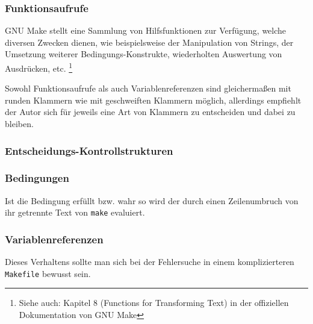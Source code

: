 	\subsubsection*{Funktionsaufrufe}  
		GNU Make stellt eine Sammlung von Hilfsfunktionen zur Verfügung, welche
		diversen Zwecken dienen, wie beispielsweise der Manipulation von
		Strings, der Umsetzung weiterer Bedingungs-Konstrukte, wiederholten
		Auswertung von Ausdrücken, etc.  \footnote{Siehe auch: Kapitel 8 (Functions
		for Transforming Text) in der offiziellen Dokumentation von GNU Make
		}

		Sowohl Funktionsaufrufe als auch Variablenreferenzen sind gleichermaßen
		mit runden Klammern wie mit geschweiften Klammern möglich, allerdings
		empfiehlt der Autor sich für jeweils eine Art von Klammern zu
		entscheiden und dabei zu bleiben.

	\pagebreak
	\subsubsection*{Entscheidungs-Kontrollstrukturen}
		

	\subsubsection*{Bedingungen}
		
		Ist die Bedingung erfüllt bzw. wahr so wird der durch einen
		Zeilenumbruch von ihr getrennte Text von \texttt{make} evaluiert.

	\subsubsection*{Variablenreferenzen}
		
		\noindent
		Dieses Verhaltens sollte man sich bei der Fehlersuche in einem
		komplizierteren \texttt{Makefile} bewusst sein.

